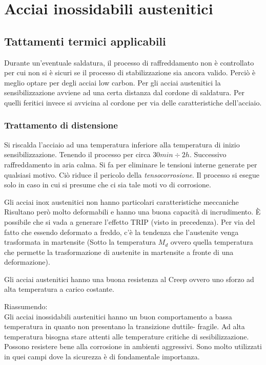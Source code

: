 \newpage
\section{Acciai inossidabili austenitici}
\subsection{Tattamenti termici applicabili}
Durante un'eventuale saldatura, il processo di raffreddamento non è 
controllato per cui non si è sicuri se il processo di stabilizzazione sia 
ancora valido. Perciò è meglio optare per degli acciai low carbon.
Per gli acciai austenitici la sensibilizzazione avviene ad una certa distanza 
dal cordone di saldatura. Per quelli feritici invece si avvicina al cordone
per via delle caratteristiche dell'acciaio.

\subsubsection{Trattamento di distensione}
Si riscalda l'acciaio ad una temperatura inferiore alla temperatura di inizio
sensibilizzazione. Tenendo il processo per circa $30min \div 2h$.
Successivo raffreddamento in aria calma. 
Si fa per eliminare le tensioni interne generate per qualsiasi motivo.
Ciò riduce il pericolo della \emph{tensocorrosione}.
Il processo si esegue solo in caso in cui si presume che ci sia tale moti vo 
di corrosione.

Gli acciai inox austenitici non hanno particolari caratteristiche meccaniche 
Risultano però molto deformabili e hanno una buona capacità di incrudimento.
È possibile che si vada a generare l'effetto \ac{TRIP} (visto in precedenza).
Per via del fatto che essendo deformato a freddo, c'è la tendenza che 
l'austenite venga trasformata in martensite (Sotto la temperatura $M_d$ 
ovvero quella temperatura che permette la trasformazione di austenite in
martensite a fronte di una deformazione).


Gli acciai austenitici hanno una buona resistenza al Creep ovvero
uno sforzo ad alta temperatura a carico costante.

Riassumendo:\\
Gli acciai inossidabili austenitici hanno un buon comportamento a bassa 
temperatura in quanto non presentano la transizione duttile-
fragile. Ad alta temperatura bisogna stare attenti alle temperature  
critiche di sesibilizzazione.
Possono resistere bene alla corrosione in ambienti aggressivi.
Sono molto utilizzati in quei campi dove la sicurezza è di 
fondamentale importanza.

